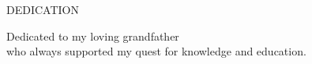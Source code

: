 \newpage
{}

\begin{center}
DEDICATION
\end{center}

\begin{center}
Dedicated to my loving grandfather\\
who always supported my quest for knowledge and education. 
\end{center}
